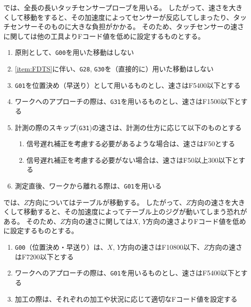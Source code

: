


\DMname では、全長の長いタッチセンサープローブを用いる。
したがって、速さを大きくして移動をすると、その加速度によってセンサーが反応してしまったり、タッチセンサーそのものに大きな負担がかかる。
そのため、タッチセンサーの速さに関しては他の工具よりFコード値を低めに設定するものとする。
\begin{enumerate}[label=\Roman*., ref=\Roman*]
\item \label{item:FDTS} 原則として、\verb|G00|を用いた移動はしない
\item \ref{item:FDTS}に伴い、\verb|G28|, \verb|G30|を（直接的に）用いた移動はしない
\item \verb|G01|を位置決め（早送り）として用いるものとし、速さはF5400以下とする
\item ワークへのアプローチの際は、\verb|G31|を用いるものとし、速さはF1500以下とする
\item 計測の際のスキップ(\verb|G31|)の速さは、計測の仕方に応じて以下のものとする
  \begin{enumerate}
  \item {}信号遅れ補正を考慮する必要があるような場合は、速さはF50とする
  \item 信号遅れ補正を考慮する必要がない場合は、速さはF50以上300以下とする
  \end{enumerate}
\item 測定直後、ワークから離れる際は、\verb|G01|を用いる
\end{enumerate}



\DMname では、$Z$方向についてはテーブルが移動する。
したがって、$Z$方向の速さを大きくして移動すると、その加速度によってテーブル上のジグが動いてしまう恐れがある。
そのため、$Z$方向の速さに関しては$X$, $Y$方向の速さよりFコード値を低めに設定するものとする。
\begin{enumerate}[label=\Roman*., ref=\Roman*]
\item \verb|G00|（位置決め・早送り）は、$X$, $Y$方向の速さはF10800以下、$Z$方向の速さはF7200以下とする
\item ワークへのアプローチの際は、\verb|G01|を用いるものとし、速さはF5400以下とする
\item 加工の際は、それぞれの加工や状況に応じて適切なFコード値を設定する
\end{enumerate}
